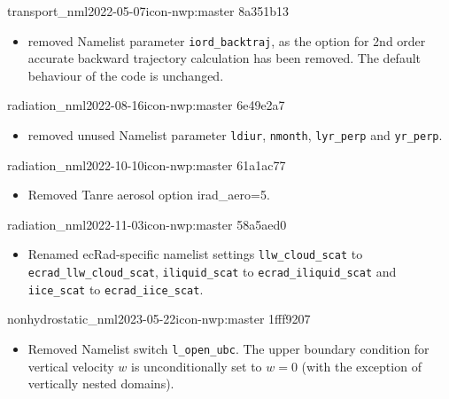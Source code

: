 \begin{changeitem}{transport\_nml}{2022-05-07}{icon-nwp:master 8a351b13}
  \begin{itemize}
   \item removed Namelist parameter \texttt{iord\_backtraj}, as the option for 2nd order accurate backward trajectory calculation has been removed. 
         The default behaviour of the code is unchanged.
  \end{itemize}
\end{changeitem}

\begin{changeitem}{radiation\_nml}{2022-08-16}{icon-nwp:master 6e49e2a7}
  \begin{itemize}
   \item removed unused Namelist parameter \texttt{ldiur}, \texttt{nmonth}, \texttt{lyr\_perp} and \texttt{yr\_perp}.
  \end{itemize}
\end{changeitem}

\begin{changeitem}{radiation\_nml}{2022-10-10}{icon-nwp:master 61a1ac77}
  \begin{itemize}
   \item Removed Tanre aerosol option irad\_aero=5.
  \end{itemize}
\end{changeitem}

\begin{changeitem}{radiation\_nml}{2022-11-03}{icon-nwp:master 58a5aed0}
  \begin{itemize}
   \item Renamed ecRad-specific namelist settings \texttt{llw\_cloud\_scat} to \texttt{ecrad\_llw\_cloud\_scat}, \texttt{iliquid\_scat} to \texttt{ecrad\_iliquid\_scat} and \texttt{iice\_scat} to \texttt{ecrad\_iice\_scat}.
  \end{itemize}
\end{changeitem}

\begin{changeitem}{nonhydrostatic\_nml}{2023-05-22}{icon-nwp:master 1fff9207}
  \begin{itemize}
   \item Removed Namelist switch \texttt{l\_open\_ubc}. The upper boundary condition for vertical velocity $w$ is unconditionally set to $w=0$ (with the exception of vertically nested domains).
  \end{itemize}
\end{changeitem}

